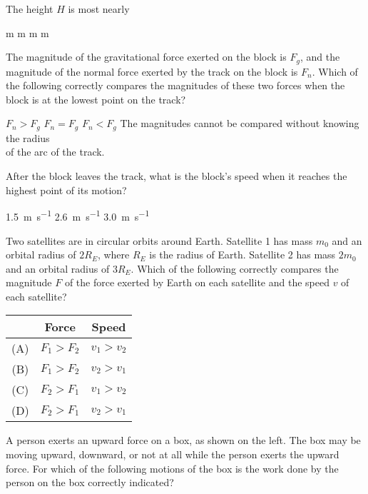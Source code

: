 \documentclass[12pt]{exam}
\begin{document}
\begin{questions}
  \question The height $H$ is most nearly
  \begin{choices}
     m
     m
     m
     m
  \end{choices}
  \label{first}
    
  \question The magnitude of the gravitational force exerted on the block is
  $F_g$, and the magnitude of the normal force exerted by the track on the
  block is $F_n$. Which of the following correctly compares the magnitudes of
  these two forces when the block is at the lowest point on the track?
  \begin{choices}
    \choice $F_n>F_g$
    \choice $F_n=F_g$
    \choice $F_n<F_g$
    \choice The magnitudes cannot be compared without knowing the radius\\
    of the arc of the track.
  \end{choices}
    
  \question After the block leaves the track, what is the block's speed when it
  reaches the highest point of its motion?
  \begin{choices}
    \hspace{.3in}
    \choice\SI{1.5}{\metre\per\second}\hspace{.3in} 
    \choice\SI{2.6}{\metre\per\second}\hspace{.3in}
    \choice\SI{3.0}{\metre\per\second}
  \end{choices}
  \label{last}
  
  \question Two satellites are in circular orbits around Earth. Satellite 1 has
  mass $m_0$ and an orbital radius of $2R_E$, where $R_E$ is the radius of
  Earth. Satellite 2 has mass $2m_0$ and an orbital radius of $3R_E$. Which of
  the following correctly compares the magnitude $F$ of the force exerted by
  Earth on each satellite and the speed $v$ of each satellite?

  \begin{tabular}{ccc}
    & Force & Speed\\ \hline
    (A) & $F_1>F_2$ & $v_1>v_2$ \\
    (B) & $F_1>F_2$ & $v_2>v_1$ \\
    (C) & $F_2>F_1$ & $v_1>v_2$ \\
    (D) & $F_2>F_1$ & $v_2>v_1$
  \end{tabular}    
  \newpage    

  \question A person exerts an upward force on a box, as shown on the left. The
  box may be moving upward, downward, or not at all while the person exerts the
  upward force. For which of the following motions of the box is the work done
  by the person on the box correctly indicated?
  

\end{questions}
\end{document}

